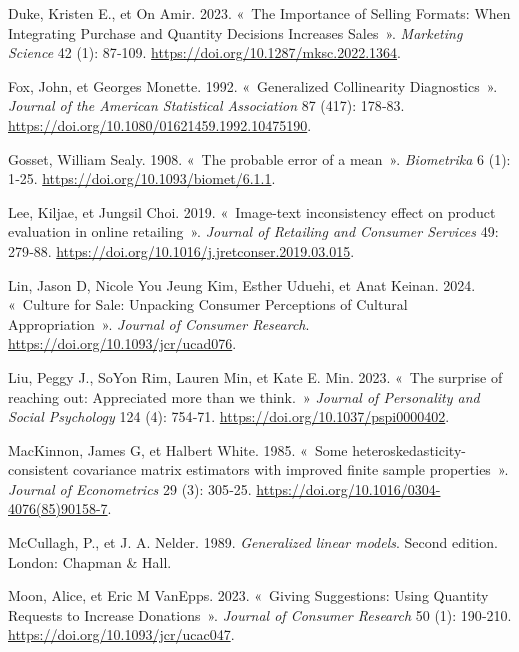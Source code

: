 \documentclass[
  11pt,
  letterpaper,
]{scrbook}
\newlength{\cslhangindent}
\newenvironment{CSLReferences}[2] %
 {\begin{list}{}{%
  \setlength{\itemindent}{0pt}
  \setlength{\leftmargin}{0pt}
  \setlength{\parsep}{0pt}
  \ifodd #1
   \setlength{\leftmargin}{\cslhangindent}
   \setlength{\itemindent}{-1\cslhangindent}
  \fi
  \setlength{\itemsep}{#2\baselineskip}}}
 {\end{list}}
\theoremstyle{plain}
\theoremstyle{definition}
\theoremstyle{plain}
\theoremstyle{definition}
\theoremstyle{remark}
\begin{document}
\begin{CSLReferences}{1}{0}
Duke, Kristen E., et On Amir. 2023. {«~The Importance of Selling
Formats: When Integrating Purchase and Quantity Decisions Increases
Sales~»}. \emph{Marketing Science} 42 (1): 87‑109.
\url{https://doi.org/10.1287/mksc.2022.1364}.

Fox, John, et Georges Monette. 1992. {«~Generalized Collinearity
Diagnostics~»}. \emph{Journal of the American Statistical Association}
87 (417): 178‑83. \url{https://doi.org/10.1080/01621459.1992.10475190}.

Gosset, William Sealy. 1908. {«~The probable error of a mean~»}.
\emph{Biometrika} 6 (1): 1‑25.
\url{https://doi.org/10.1093/biomet/6.1.1}.

Lee, Kiljae, et Jungsil Choi. 2019. {«~Image-text inconsistency effect
on product evaluation in online retailing~»}. \emph{Journal of Retailing
and Consumer Services} 49: 279‑88.
\url{https://doi.org/10.1016/j.jretconser.2019.03.015}.

Lin, Jason D, Nicole You Jeung Kim, Esther Uduehi, et Anat Keinan. 2024.
{«~Culture for Sale: Unpacking Consumer Perceptions of Cultural
Appropriation~»}. \emph{Journal of Consumer Research}.
\url{https://doi.org/10.1093/jcr/ucad076}.

Liu, Peggy J., SoYon Rim, Lauren Min, et Kate E. Min. 2023. {«~The
surprise of reaching out: Appreciated more than we think.~»}
\emph{Journal of Personality and Social Psychology} 124 (4): 754‑71.
\url{https://doi.org/10.1037/pspi0000402}.

MacKinnon, James G, et Halbert White. 1985. {«~Some
heteroskedasticity-consistent covariance matrix estimators with improved
finite sample properties~»}. \emph{Journal of Econometrics} 29 (3):
305‑25. \url{https://doi.org/10.1016/0304-4076(85)90158-7}.

McCullagh, P., et J. A. Nelder. 1989. \emph{Generalized linear models}.
{S}econd edition. London: Chapman \& Hall.

Moon, Alice, et Eric M VanEpps. 2023. {«~Giving Suggestions: Using
Quantity Requests to Increase Donations~»}. \emph{Journal of Consumer
Research} 50 (1): 190‑210. \url{https://doi.org/10.1093/jcr/ucac047}.


\end{CSLReferences}
\end{document}
